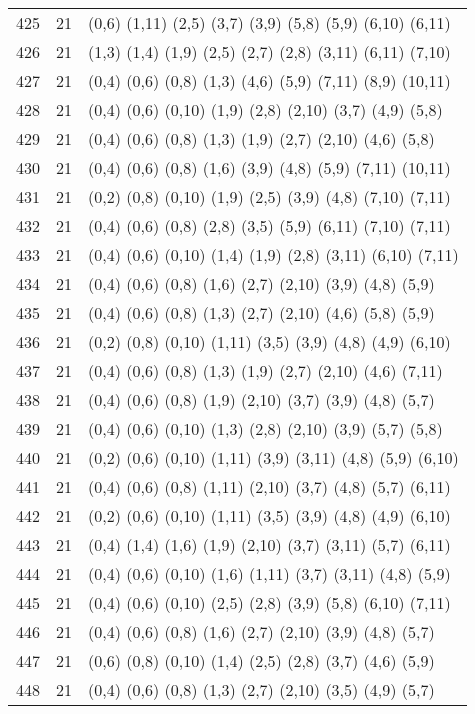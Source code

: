 {\begin{longtable}{lll}
425 & 21 & (0,6) (1,11) (2,5) (3,7) (3,9) (5,8) (5,9) (6,10) (6,11) \\
426 & 21 & (1,3) (1,4) (1,9) (2,5) (2,7) (2,8) (3,11) (6,11) (7,10) \\
427 & 21 & (0,4) (0,6) (0,8) (1,3) (4,6) (5,9) (7,11) (8,9) (10,11) \\
428 & 21 & (0,4) (0,6) (0,10) (1,9) (2,8) (2,10) (3,7) (4,9) (5,8) \\
429 & 21 & (0,4) (0,6) (0,8) (1,3) (1,9) (2,7) (2,10) (4,6) (5,8) \\
430 & 21 & (0,4) (0,6) (0,8) (1,6) (3,9) (4,8) (5,9) (7,11) (10,11) \\
431 & 21 & (0,2) (0,8) (0,10) (1,9) (2,5) (3,9) (4,8) (7,10) (7,11) \\
432 & 21 & (0,4) (0,6) (0,8) (2,8) (3,5) (5,9) (6,11) (7,10) (7,11) \\
433 & 21 & (0,4) (0,6) (0,10) (1,4) (1,9) (2,8) (3,11) (6,10) (7,11) \\
434 & 21 & (0,4) (0,6) (0,8) (1,6) (2,7) (2,10) (3,9) (4,8) (5,9) \\
435 & 21 & (0,4) (0,6) (0,8) (1,3) (2,7) (2,10) (4,6) (5,8) (5,9) \\
436 & 21 & (0,2) (0,8) (0,10) (1,11) (3,5) (3,9) (4,8) (4,9) (6,10) \\
437 & 21 & (0,4) (0,6) (0,8) (1,3) (1,9) (2,7) (2,10) (4,6) (7,11) \\
438 & 21 & (0,4) (0,6) (0,8) (1,9) (2,10) (3,7) (3,9) (4,8) (5,7) \\
439 & 21 & (0,4) (0,6) (0,10) (1,3) (2,8) (2,10) (3,9) (5,7) (5,8) \\
440 & 21 & (0,2) (0,6) (0,10) (1,11) (3,9) (3,11) (4,8) (5,9) (6,10) \\
441 & 21 & (0,4) (0,6) (0,8) (1,11) (2,10) (3,7) (4,8) (5,7) (6,11) \\
442 & 21 & (0,2) (0,6) (0,10) (1,11) (3,5) (3,9) (4,8) (4,9) (6,10) \\
443 & 21 & (0,4) (1,4) (1,6) (1,9) (2,10) (3,7) (3,11) (5,7) (6,11) \\
444 & 21 & (0,4) (0,6) (0,10) (1,6) (1,11) (3,7) (3,11) (4,8) (5,9) \\
445 & 21 & (0,4) (0,6) (0,10) (2,5) (2,8) (3,9) (5,8) (6,10) (7,11) \\
446 & 21 & (0,4) (0,6) (0,8) (1,6) (2,7) (2,10) (3,9) (4,8) (5,7) \\
447 & 21 & (0,6) (0,8) (0,10) (1,4) (2,5) (2,8) (3,7) (4,6) (5,9) \\
448 & 21 & (0,4) (0,6) (0,8) (1,3) (2,7) (2,10) (3,5) (4,9) (5,7) \\

\end{longtable}}
